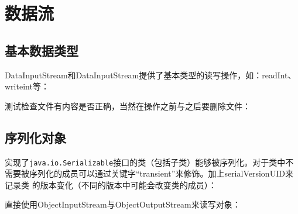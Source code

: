 \section{数据流}



\subsection{基本数据类型}

DataInputStream和DataInputStream提供了基本类型的读写操作，如：readInt、
writeint等：



测试检查文件有内容是否正确，当然在操作之前与之后要删除文件：





\subsection{序列化对象}

实现了\verb|java.io.Serializable|接口的类（包括子类）能够被序列化。对于类中不
需要被序列化的成员可以通过关键字“transient”来修饰。加上serialVersionUID来记录类
的版本变化（不同的版本中可能会改变类的成员）：



直接使用ObjectInputStream与ObjectOutputStream来读写对象：




